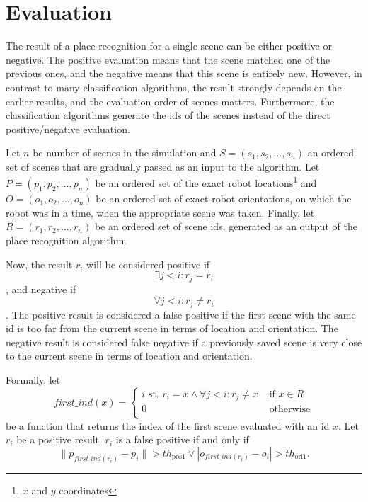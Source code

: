\section{Evaluation}\label{section:Evaluation}

The result of a place recognition for a single scene can be either positive or negative. The positive evaluation means that the scene matched one of the previous ones, and the negative means that this scene is entirely new. However, in contrast to many classification algorithms, the result strongly depends on the earlier results, and the evaluation order of scenes matters. Furthermore, the classification algorithms generate the ids of the scenes instead of the direct positive/negative evaluation.\par
Let $n$ be number of scenes in the simulation and $S = \left(s_1, s_2, \dots, s_n\right)$ an ordered set of scenes that are gradually passed as an input to the algorithm. Let $P = \left(p_1, p_2, \dots, p_n\right)$ be an ordered set of the exact robot locations\footnote{$x$ and $y$ coordinates} and $O = \left(o_1, o_2, \dots, o_n\right)$ be an ordered set of exact robot orientations, on which the robot was in a time, when the appropriate scene was taken. Finally, let $R = \left(r_1, r_2, \dots, r_n \right)$ be an ordered set of scene ids, generated as an output of the place recognition algorithm.\par
Now, the result $r_i$ will be considered positive if
$$
    \exists j < i : r_j = r_i
$$, and negative if
$$
    \forall j < i : r_j \neq r_i
$$. The positive result is considered a false positive if the first scene with the same id is too far from the current scene in terms of location and orientation. The negative result is considered false negative if a previously saved scene is very close to the current scene in terms of location and orientation.\par
Formally, let
$$
    first\_ind(x) = \begin{cases}
        i\text{ st. } r_i = x \land \forall j < i: r_j \neq x & \text{ if $x \in R$} \\
        0                                                     & \text{ otherwise}    \\
    \end{cases}
$$
be a function that returns the index of the first scene evaluated with an id $x$. Let $r_i$ be a positive result. $r_i$ is a false positive if and only if
$$
    \| p_{first\_ind(r_i)} - p_i \| > th_\text{pos1} \lor | o_{first\_ind(r_i)} - o_i | > th_{\text{ori1}}.
$$\par
